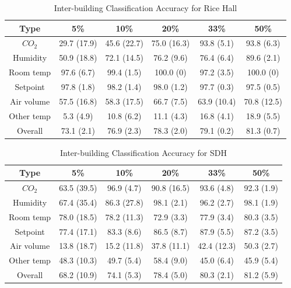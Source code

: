 \begin{table}[ht!]
\caption{Inter-building Classification Accuracy for Rice Hall}
\centering %
\begin{tabular}{c | c | c | c | c | c}%
\hline %
Type & 5\% & 10\% & 20\% & 33\% & 50\% \\ %
\hline\hline %
$CO_{2}$ & 29.7 (17.9) & 45.6 (22.7) & 75.0 (16.3) & 93.8 (5.1) & 93.8 (6.3)\\ \hline
Humidity & 50.9 (18.8) & 72.1 (14.5) & 76.2 (9.6) & 76.4 (6.4) & 89.6 (2.1)\\ \hline
Room temp & 97.6 (6.7) & 99.4 (1.5) & 100.0 (0) & 97.2 (3.5) & 100.0 (0)\\ \hline
Setpoint & 97.8 (1.8) & 98.2 (1.4) & 98.0 (1.2) & 97.7 (0.3) & 97.5 (0.5)\\ \hline
Air volume & 57.5 (16.8) & 58.3 (17.5) & 66.7 (7.5) & 63.9 (10.4) & 70.8 (12.5)\\ \hline
Other temp & 5.3 (4.9) & 10.8 (6.2) & 11.1 (4.3) & 16.8 (4.1) & 18.9 (5.5)\\ \hline
Overall & 73.1 (2.1) & 76.9 (2.3) & 78.3 (2.0) & 79.1 (0.2) & 81.3 (0.7)\\ \hline
\end{tabular}
\label{table:rice_x} %
\end{table}

\begin{table}[ht!]
\caption{Inter-building Classification Accuracy for SDH}
\centering %
\begin{tabular}{c | c | c | c | c | c} \hline
Type & 5\% & 10\% & 20\% & 33\% & 50\% \\ %
\hline\hline %
$CO_{2}$ & 63.5 (39.5) & 96.9 (4.7) & 90.8 (16.5) & 93.6 (4.8) & 92.3 (1.9)\\ \hline
Humidity & 67.4 (35.4) & 86.3 (27.8) & 98.1 (2.1) & 96.2 (2.7) & 98.1 (1.9)\\ \hline
Room temp & 78.0 (18.5) & 78.2 (11.3) & 72.9 (3.3) & 77.9 (3.4) & 80.3 (3.5)\\ \hline
Setpoint & 77.4 (17.1) & 83.3 (8.6) & 86.5 (8.7) & 87.9 (5.5) & 87.2 (3.5)\\ \hline
Air volume & 13.8 (18.7) & 15.2 (11.8) & 37.8 (11.1) & 42.4 (12.3) & 50.3 (2.7)\\ \hline
Other temp & 48.3 (10.3) & 49.7 (5.4) & 58.4 (9.0) & 45.0 (6.4) & 45.9 (5.4)\\ \hline
Overall & 68.2 (10.9) & 74.1 (5.3) & 78.4 (5.0) & 80.3 (2.1) & 81.2 (5.9)\\ \hline
\end{tabular}
\label{table:sdh_x} %
\end{table}

